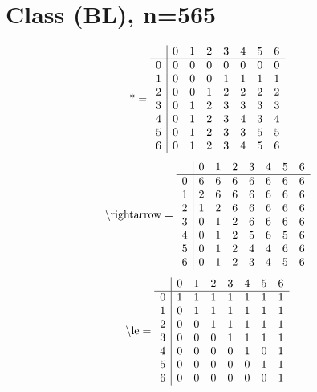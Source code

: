 \documentclass[11pt]{article}
\begin{document}
\section{Class (BL), n=565}
\[\text{*} = 
\begin{array}{r | r r r r r r r}
 & 0 & 1 & 2 & 3 & 4 & 5 & 6 \\ \hline
0 & 0 & 0 & 0 & 0 & 0 & 0 & 0 \\
1 & 0 & 0 & 0 & 1 & 1 & 1 & 1 \\
2 & 0 & 0 & 1 & 2 & 2 & 2 & 2 \\
3 & 0 & 1 & 2 & 3 & 3 & 3 & 3 \\
4 & 0 & 1 & 2 & 3 & 4 & 3 & 4 \\
5 & 0 & 1 & 2 & 3 & 3 & 5 & 5 \\
6 & 0 & 1 & 2 & 3 & 4 & 5 & 6 \\
\end{array}
\]
\[\text{\textbackslash rightarrow} = 
\begin{array}{r | r r r r r r r}
 & 0 & 1 & 2 & 3 & 4 & 5 & 6 \\ \hline
0 & 6 & 6 & 6 & 6 & 6 & 6 & 6 \\
1 & 2 & 6 & 6 & 6 & 6 & 6 & 6 \\
2 & 1 & 2 & 6 & 6 & 6 & 6 & 6 \\
3 & 0 & 1 & 2 & 6 & 6 & 6 & 6 \\
4 & 0 & 1 & 2 & 5 & 6 & 5 & 6 \\
5 & 0 & 1 & 2 & 4 & 4 & 6 & 6 \\
6 & 0 & 1 & 2 & 3 & 4 & 5 & 6 \\
\end{array}
\]
\[\text{\textbackslash le} = 
\begin{array}{r | r r r r r r r}
 & 0 & 1 & 2 & 3 & 4 & 5 & 6 \\ \hline
0 & 1 & 1 & 1 & 1 & 1 & 1 & 1 \\
1 & 0 & 1 & 1 & 1 & 1 & 1 & 1 \\
2 & 0 & 0 & 1 & 1 & 1 & 1 & 1 \\
3 & 0 & 0 & 0 & 1 & 1 & 1 & 1 \\
4 & 0 & 0 & 0 & 0 & 1 & 0 & 1 \\
5 & 0 & 0 & 0 & 0 & 0 & 1 & 1 \\
6 & 0 & 0 & 0 & 0 & 0 & 0 & 1 \\
\end{array}
\]
\end{document}
